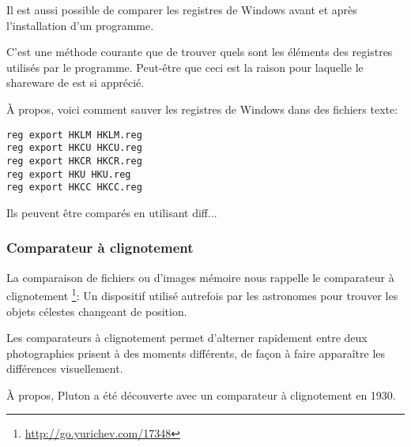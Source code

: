 Il est aussi possible de comparer les registres de Windows avant et après l'installation
d'un programme.

C'est une méthode courante  que de trouver quels sont les éléments des registres
utilisés par le programme. Peut-être que ceci est la raison pour laquelle le shareware
de  est si apprécié.

À propos, voici comment sauver les registres de Windows dans des fichiers texte:

\begin{lstlisting}
reg export HKLM HKLM.reg
reg export HKCU HKCU.reg
reg export HKCR HKCR.reg
reg export HKU HKU.reg
reg export HKCC HKCC.reg
\end{lstlisting}

Ils peuvent être comparés en utilisant diff...

\subsubsection{Comparateur à clignotement}

La comparaison de fichiers ou d'images mémoire nous rappelle le comparateur à clignotement
\footnote{\url{http://go.yurichev.com/17348}}:
Un dispositif utilisé autrefois par les astronomes pour trouver les objets célestes
changeant de position.

Les comparateurs à clignotement permet d'alterner rapidement entre deux photographies
prisent à des moments différents, de façon à faire apparaître les différences visuellement.

À propos, Pluton a été découverte avec un comparateur à clignotement en 1930.
